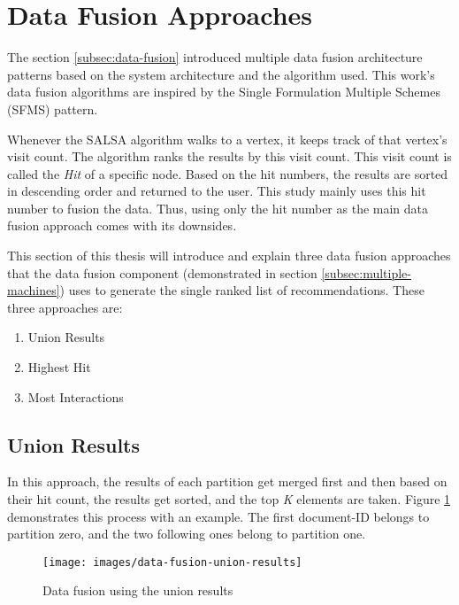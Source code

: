 \section{Data Fusion Approaches}
\label{sec:data-fusion-approaches}
The section \ref{subsec:data-fusion} introduced multiple data fusion architecture patterns based on the system architecture and the algorithm used. This work's data fusion algorithms are inspired by the Single Formulation Multiple Schemes (SFMS) pattern. 

Whenever the SALSA algorithm walks to a vertex, it keeps track of that vertex's visit count. The algorithm ranks the results by this visit count. This visit count is called the \emph{Hit} of a specific node. Based on the hit numbers, the results are sorted in descending order and returned to the user. This study mainly uses this hit number to fusion the data. Thus, using only the hit number as the main data fusion approach comes with its downsides.


This section of this thesis will introduce and explain three data fusion approaches that the data fusion component (demonstrated in section \ref{subsec:multiple-machines}) uses to generate the single ranked list of recommendations. These three approaches are:

\begin{enumerate}
    \item Union Results
    \item Highest Hit
    \item Most Interactions
\end{enumerate}

\subsection{Union Results}
\label{subsec:data-fusion-union-results}
In this approach, the results of each partition get merged first and then based on their hit count, the results get sorted, and the top \emph{K} elements are taken. Figure \ref{fig:data-fusion-union-results} demonstrates this process with an example. The first document-ID belongs to partition zero, and the two following ones belong to partition one.


\begin{figure}[!hb]
    \centering
    \texttt{[image: images/data-fusion-union-results]}
    \caption{Data fusion using the union results}
    \label{fig:data-fusion-union-results}
\end{figure}

